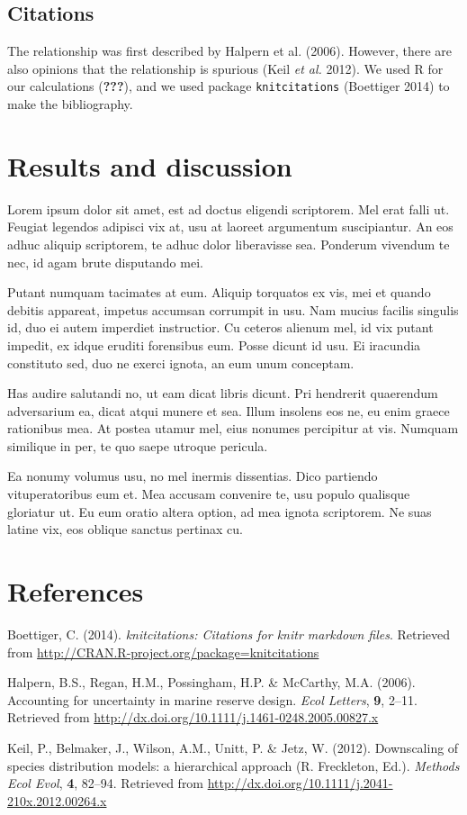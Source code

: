 \documentclass[]{article}
\begin{document}
\subsection{Citations}\label{citations}

The relationship was first described by Halpern et al. (2006). However,
there are also opinions that the relationship is spurious (Keil \emph{et
al.} 2012). We used R for our calculations ({\textbf{???}}), and we used
package \texttt{knitcitations} (Boettiger 2014) to make the
bibliography.

\section{Results and discussion}\label{results-and-discussion}

Lorem ipsum dolor sit amet, est ad doctus eligendi scriptorem. Mel erat
falli ut. Feugiat legendos adipisci vix at, usu at laoreet argumentum
suscipiantur. An eos adhuc aliquip scriptorem, te adhuc dolor
liberavisse sea. Ponderum vivendum te nec, id agam brute disputando mei.

Putant numquam tacimates at eum. Aliquip torquatos ex vis, mei et quando
debitis appareat, impetus accumsan corrumpit in usu. Nam mucius facilis
singulis id, duo ei autem imperdiet instructior. Cu ceteros alienum mel,
id vix putant impedit, ex idque eruditi forensibus eum. Posse dicunt id
usu. Ei iracundia constituto sed, duo ne exerci ignota, an eum unum
conceptam.

Has audire salutandi no, ut eam dicat libris dicunt. Pri hendrerit
quaerendum adversarium ea, dicat atqui munere et sea. Illum insolens eos
ne, eu enim graece rationibus mea. At postea utamur mel, eius nonumes
percipitur at vis. Numquam similique in per, te quo saepe utroque
pericula.

Ea nonumy volumus usu, no mel inermis dissentias. Dico partiendo
vituperatoribus eum et. Mea accusam convenire te, usu populo qualisque
gloriatur ut. Eu eum oratio altera option, ad mea ignota scriptorem. Ne
suas latine vix, eos oblique sanctus pertinax cu.

\section*{References}\label{references}

Boettiger, C. (2014). \emph{knitcitations: Citations for knitr markdown
files}. Retrieved from
\url{http://CRAN.R-project.org/package=knitcitations}

Halpern, B.S., Regan, H.M., Possingham, H.P. \& McCarthy, M.A. (2006).
Accounting for uncertainty in marine reserve design. \emph{Ecol
Letters}, \textbf{9}, 2--11. Retrieved from
\url{http://dx.doi.org/10.1111/j.1461-0248.2005.00827.x}

Keil, P., Belmaker, J., Wilson, A.M., Unitt, P. \& Jetz, W. (2012).
Downscaling of species distribution models: a hierarchical approach (R.
Freckleton, Ed.). \emph{Methods Ecol Evol}, \textbf{4}, 82--94.
Retrieved from \url{http://dx.doi.org/10.1111/j.2041-210x.2012.00264.x}
\end{document}
